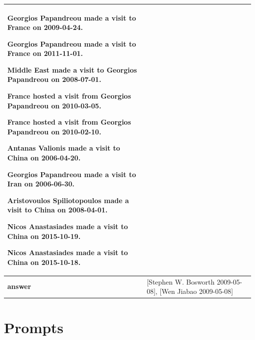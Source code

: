 \documentclass[11pt]{article}
\begin{document}
\begin{table}[h]
\begin{tabular}{p{} p{}}
Georgios Papandreou made a visit to France on 2009-04-24. \par
Georgios Papandreou made a visit to France on 2011-11-01. \par
Middle East made a visit to Georgios Papandreou on 2008-07-01. \par
France hosted a visit from Georgios Papandreou on 2010-03-05. \par
France hosted a visit from Georgios Papandreou on 2010-02-10. \par
Antanas Valionis made a visit to China on 2006-04-20. \par
Georgios Papandreou made a visit to Iran on 2006-06-30. \par
Aristovoulos Spiliotopoulos made a visit to China on 2008-04-01. \par
Nicos Anastasiades made a visit to China on 2015-10-19. \par
Nicos Anastasiades made a visit to China on 2015-10-18. \\
\midrule
\textbf{answer} & [Stephen W. Bosworth 2009-05-08], [Wen Jiabao 2009-05-08] \\
\bottomrule
\end{tabular}

\end{table}

\section{Prompts}
\end{document}
